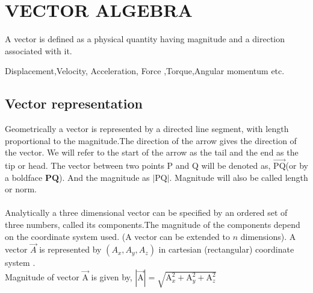 \chapter{VECTOR ALGEBRA}

\begin{definition}
A vector is defined as a physical quantity having magnitude and a direction associated with it. 
\end{definition}
\begin{example}
	 Displacement,Velocity, Acceleration, Force ,Torque,Angular momentum etc. 
\end{example}
\section{Vector representation}
Geometrically  a  vector  is  represented  by  a  directed  line  segment, with length proportional to the magnitude.The direction of the arrow gives the direction of the vector.\newline
We will refer to the start of the arrow as the tail and the end as the tip or head. The vector between two points P and Q  will be denoted as, $\overrightarrow{\mathrm{P Q}}$(or by a boldface $\mathbf{PQ}$). And the  magnitude as $|\mathrm{ PQ}| .$  Magnitude will also be called length or norm.\\\\ Analytically a three  dimensional  vector  can  be  specified  by  an  ordered  set  of  three  numbers,  called  its  components.The magnitude  of  the  components  depend  on  the  coordinate  system  used. (A vector can be extended to $n$ dimensions). A vector $\vec{A}$ is represented by $\left(A_{x}, A_{y}, A_{z}\right)$ in cartesian (rectangular) coordinate system .\\Magnitude of vector $\vec{\mathrm A}$ is given by, $|\vec{\mathrm A}|=\sqrt{\mathrm A_{x}^{2}+\mathrm A_{y}^{2}+\mathrm A_{z}^{2}}$
